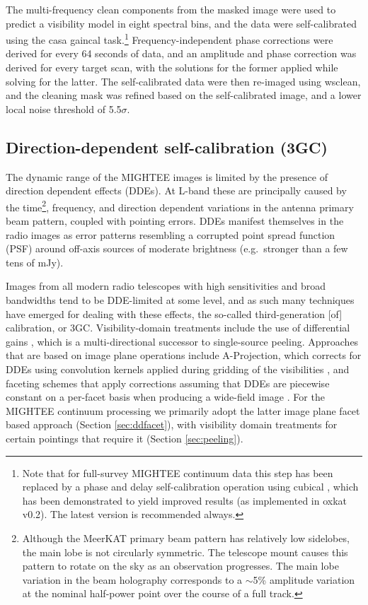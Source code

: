 \documentclass[usenatbib,usedcolumn]{mnras}
\begin{document}
The multi-frequency clean components from the masked image were used to predict a visibility model in eight spectral bins, and the data were self-calibrated using the {\sc casa} {\sc gaincal} task.\footnote{Note that for full-survey MIGHTEE continuum data this step has been replaced by a phase and delay self-calibration operation using {\sc cubical} \citep{kenyon2018}, which has been demonstrated to yield improved results (as implemented in {\sc oxkat v0.2}). The latest version is recommended always.} Frequency-independent phase corrections were derived for every 64 seconds of data, and an amplitude and phase correction was derived for every target scan, with the solutions for the former applied while solving for the latter. The self-calibrated data were then re-imaged using {\sc wsclean}, and the cleaning mask was refined based on the self-calibrated image, and a lower local noise threshold of 5.5$\sigma$.

\subsection{Direction-dependent self-calibration (3GC)}
\label{sec:dd_selfcal}

The dynamic range of the MIGHTEE images is limited by the presence of direction dependent effects (DDEs). At L-band these are principally caused by the time\footnote{Although the MeerKAT primary beam pattern has relatively low sidelobes, the main lobe is not circularly symmetric. The telescope mount causes this pattern to rotate on the sky as an observation progresses. The main lobe variation in the beam holography corresponds to a $\sim$5\% amplitude variation at the nominal half-power point over the course of a full track.}, frequency, and direction dependent variations in the antenna primary beam pattern, coupled with pointing errors. DDEs manifest themselves in the radio images as error patterns resembling a corrupted point spread function (PSF) around off-axis sources of moderate brightness (e.g.~stronger than a few tens of mJy). 

Images from all modern radio telescopes with high sensitivities and broad bandwidths tend to be DDE-limited at some level, and as such many techniques have emerged for dealing with these effects, the so-called third-generation [of] calibration, or 3GC. Visibility-domain treatments include the use of differential gains \citep{smirnov2011b,smirnov2011c}, which is a multi-directional successor to single-source peeling. Approaches that are based on image plane operations include A-Projection, which corrects for DDEs using convolution kernels applied during gridding of the visibilities \citep{bhatnagar2013}, and faceting schemes that apply corrections assuming that DDEs are piecewise constant on a per-facet basis when producing a wide-field image \citep{tasse2018}. For the MIGHTEE continuum processing we primarily adopt the latter image plane facet based approach (Section \ref{sec:ddfacet}), with visibility domain treatments for certain pointings that require it (Section \ref{sec:peeling}).
\end{document}
